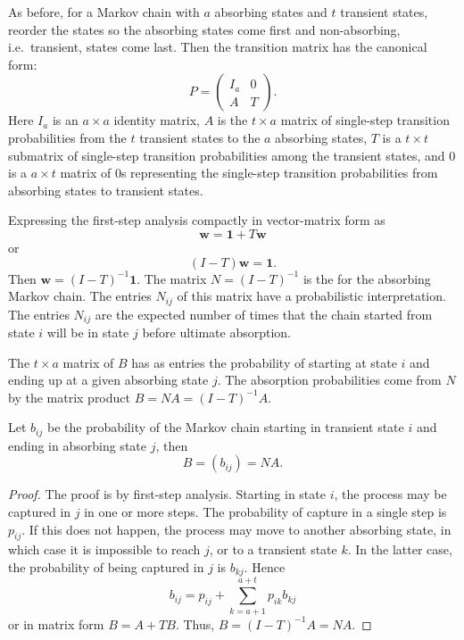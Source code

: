 \documentclass[12pt]{article}
\begin{document}
As before, for a Markov chain with \( a \) absorbing states and \( t \)
transient states, reorder the states so the absorbing states come first
and non-absorbing, i.e.\ transient, states come last.  Then the
transition matrix has the canonical form:
\[
    P =
    \begin{pmatrix}
        I_a & 0 \\
        A & T
    \end{pmatrix}
    .
\] Here \( I_{a} \) is an \( a \times a \) identity matrix, \( A \) is
the \( t \times a \) matrix of single-step transition probabilities from
the \( t \) transient states to the \( a \) absorbing states, \( T \) is
a \( t \times t \) submatrix of single-step transition probabilities
among the transient states, and \( 0 \) is a \( a \times t \) matrix of \(
0 \)s representing the single-step transition probabilities from
absorbing states to transient states.

Expressing the first-step analysis compactly in vector-matrix form as
\[
    \mathbf{w} = \mathbf{1} + T \mathbf{w}
\] or
\[
    (I - T) \mathbf{w} = \mathbf{1}.
\] Then \( \mathbf{w} = (I-T)^{-1} \mathbf{1} \).  The matrix \( N = (I-T)^
{-1} \) is the %
for the absorbing Markov chain.  The entries \( N_{ij} \) of this matrix
have a probabilistic interpretation.  The entries \( N_{ij} \) are the
expected number of times that the chain started from state \( i \) will
be in state \( j \) before ultimate absorption.

The \( t \times a \) matrix of %
\( B \) has as entries the probability of starting at state \( i \) and
ending up at a given absorbing state \( j \).  The absorption
probabilities come from \( N \) by the matrix product \( B = NA = (I-T)^
{-1}A \).

\begin{theorem}
    Let \( b_{ij} \) be the probability of the Markov chain starting in
    transient state \( i \) and ending in absorbing state \( j \), then
    \[
        B = ( b_{ij} ) = NA.
    \]
\end{theorem}

\begin{proof}
    The proof is by first-step analysis.  Starting in state \( i \), the
    process may be captured in \( j \) in one or more steps.  The
    probability of capture in a single step is \( p_{ij} \).  If this
    does not happen, the process may move to another absorbing state, in
    which case it is impossible to reach \( j \), or to a transient
    state \( k \).  In the latter case, the probability of being
    captured in \( j \) is \( b_{kj} \).  Hence
    \[
        b_{ij} = p_{ij} + \sum\limits_{k =a+1}^{a+t} p_{ik} b_{kj}
    \] or in matrix form \( B = A + TB \).  Thus, \( B = (I-T)^{-1} A =
    NA \).
\end{proof}
\end{document}

